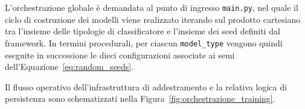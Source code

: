 L'orchestrazione globale è demandata al punto di ingresso \texttt{main.py}, nel quale il ciclo di costruzione dei modelli viene realizzato iterando sul prodotto cartesiano tra l'insieme delle tipologie di classificatore e l'insieme dei seed definiti dal framework. 
In termini procedurali, per ciascun \texttt{model\_type} vengono quindi eseguite in successione le dieci configurazioni associate ai semi dell'Equazione~\eqref{eq:random_seeds}.

Il flusso operativo dell'infrastruttura di addestramento e la relativa logica di persistenza sono schematizzati nella Figura~\ref{fig:orchestrazione_training}.

\begin{figure}[H]
\centering
{}
\end{figure}
